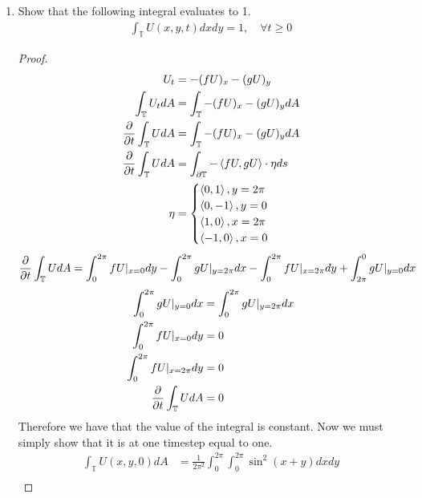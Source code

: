 \documentclass{article}
\begin{document}
\begin{enumerate}[label=\alph*)]

    \item Show that the following integral evaluates to 1. 
    \begin{align*}
        \int_{\mathbb{T}} U(x,y,t)dxdy = 1,\quad  \forall t \ge 0
    \end{align*}
    \begin{proof}
        \begin{align*}
            U_t &= -(fU)_x - (gU)_y \\
            \int_{\mathbb{T}} U_t dA &= \int_{\mathbb{T}}-(fU)_x - (gU)_y dA\\
            \frac{\partial }{\partial t}\int_{\mathbb{T}} U dA &= \int_{\mathbb{T}}-(fU)_x - (gU)_y dA\\
            \frac{\partial }{\partial t}\int_{\mathbb{T}} U dA &= \int_{\partial\mathbb{T}} -\left<fU,
            gU\right>\cdot \eta ds\\
            \eta &= 
            \begin{cases}
                \left<0,1\right>, y = 2\pi\\
                \left<0,-1\right>, y = 0\\
                \left<1,0\right>, x = 2\pi\\
                \left<-1,0\right>, x = 0
            \end{cases}
        \end{align*}
        \begin{align*}
            \frac{\partial }{\partial t}\int_{\mathbb{T}} U dA &= \int_0^{2\pi} fU|_{x=0} dy
            - \int_0^{2\pi} gU|_{y=2\pi} dx 
            - \int_0^{2\pi} fU|_{x=2\pi} dy
            + \int_{2\pi}^0 gU|_{y=0} dx \\
        \end{align*}
        \begin{align*}
            \int_0^{2\pi} gU|_{y=0} dx &= \int_0^{2\pi} gU|_{y=2\pi} dx\\
            \int_0^{2\pi} fU|_{x=0} dy &= 0 \\
            \int_0^{2\pi} fU|_{x=2\pi} dy &= 0\\ 
            \frac{\partial }{\partial t}\int_{\mathbb{T}} U dA &= 0 
        \end{align*}
        Therefore we have that the value of the integral is constant. Now we
        must simply show that it is at one timestep equal to one. 
        \begin{align*}
            \int_{\mathbb{T}} U(x,y,0) dA &=
            \frac{1}{2\pi^2}\int_0^{2\pi}\int_0^{2\pi} \sin^2(x+y)dxdy\\

\end{align*}
\end{proof}
\end{enumerate}
\end{document}
